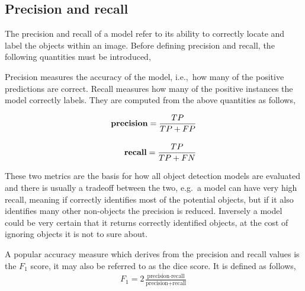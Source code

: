 \subsection{Precision and recall}
The precision and recall of a model refer to its ability to correctly locate and label the objects within an image.
Before defining precision and recall, the following quantities must be introduced,

\begin{center}
  {\setlength{\fboxsep}{1em}
  }
\end{center}

Precision measures the accuracy of the model, i.e.,~how many of the positive predictions are correct.
Recall measures how many of the positive instances the model correctly labels.
They are computed from the above quantities as follows,

\begin{align*}
  \text{\bf precision}=\frac{TP}{TP+FP}\\[1em]
  \text{\bf recall}=\frac{TP}{TP+FN}
\end{align*}

These two metrics are the basis for how all object detection models are evaluated and there is usually a tradeoff between the two, e.g.\ a model can have very high recall, meaning if correctly identifies most of the potential objects, but if it also identifies many other non-objects the precision is reduced.
Inversely a model could be very certain that it returns correctly identified objects, at the cost of ignoring objects it is not to sure about.

A popular accuracy measure which derives from the precision and recall values is the \(F_1\) score, it may also be referred to as the dice score.
It is defined as follows,
%
\begin{align*}
  F_1=2\frac{\text{precision}\cdot\text{recall}}{\text{precision}+\text{recall}}
\end{align*}

